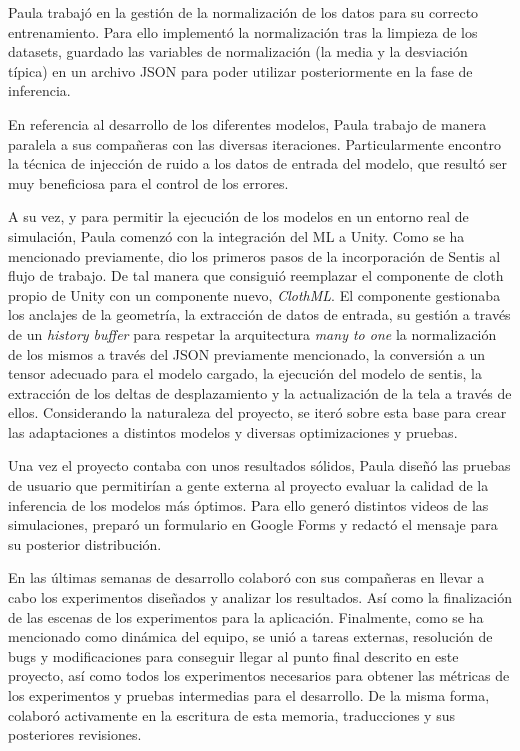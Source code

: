 Paula trabajó en la gestión de la normalización de los datos para su correcto entrenamiento. Para ello implementó la normalización tras la limpieza de los datasets, guardado las variables de normalización (la media y la desviación típica) en un archivo JSON para poder utilizar posteriormente en la fase de inferencia.  \newline 

En referencia al desarrollo de los diferentes modelos, Paula trabajo de manera paralela a sus compañeras con las diversas iteraciones. Particularmente encontro la técnica de injección de ruido a los datos de entrada del modelo, que resultó ser muy beneficiosa para el control de los errores. \newline

A su vez, y para permitir la ejecución de los modelos en un entorno real de simulación, Paula comenzó con la integración del ML a Unity. Como se ha mencionado previamente, dio los primeros pasos de la incorporación de Sentis al flujo de trabajo. De tal manera que consiguió reemplazar el componente de cloth propio de Unity con un componente nuevo, \textit{ClothML}. El componente gestionaba los anclajes de la geometría, la extracción de datos de entrada, su gestión a través de un \textit{history buffer} para respetar la arquitectura \textit{many to one} la normalización de los mismos a través del JSON previamente mencionado, la conversión a un tensor adecuado para el modelo cargado, la ejecución del modelo de sentis, la extracción de los deltas de desplazamiento y la actualización de la tela a través de ellos. Considerando la naturaleza del proyecto, se iteró sobre esta base para crear las adaptaciones a distintos modelos y diversas optimizaciones y pruebas. \newline

Una vez el proyecto contaba con unos resultados sólidos, Paula diseñó las pruebas de usuario que permitirían a gente externa al proyecto evaluar la calidad de la inferencia de los modelos más óptimos. Para ello generó distintos videos de las simulaciones, preparó un formulario en Google Forms y redactó el mensaje para su posterior distribución. \newline

En las últimas semanas de desarrollo colaboró con sus compañeras en llevar a cabo los experimentos diseñados y analizar los resultados. Así como la finalización de las escenas de los experimentos para la aplicación. Finalmente, como se ha mencionado como dinámica del equipo, se unió a tareas externas, resolución de bugs y modificaciones para conseguir llegar al punto final descrito en este proyecto, así como todos los experimentos necesarios para obtener las métricas de los experimentos y pruebas intermedias para el desarrollo. De la misma forma, colaboró activamente en la escritura de esta memoria, traducciones y sus posteriores revisiones.

